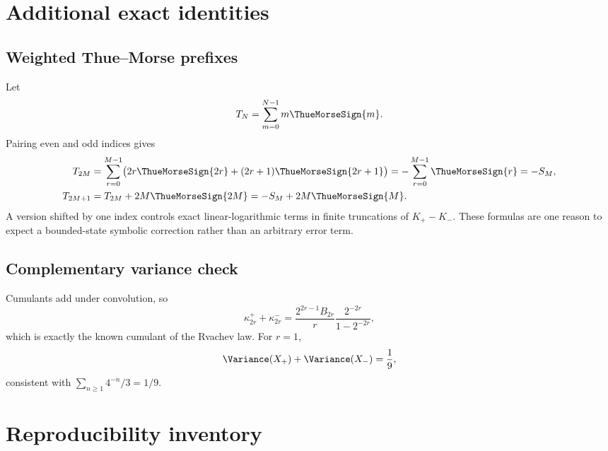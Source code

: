 \documentclass[11pt,oneside]{article}
\numberwithin{equation}{section}
\theoremstyle{definition}
\theoremstyle{remark}
\begin{document}
\appendix

\section{Additional exact identities}

\subsection{Weighted Thue--Morse prefixes}
Let
\begin{equation}
 T_N=\sum_{m=0}^{N-1}m\ThueMorseSign{m}.
 \label{eq:weighted-prefix-def}
\end{equation}
Pairing even and odd indices gives
\begin{align}
 T_{2M}
 &=\sum_{r=0}^{M-1}\bigl(2r\ThueMorseSign{2r}+(2r+1)\ThueMorseSign{2r+1}\bigr)
 =-\sum_{r=0}^{M-1}\ThueMorseSign{r}=-S_M,
 \label{eq:T-even}\\
 T_{2M+1}
 &=T_{2M}+2M\ThueMorseSign{2M}
 =-S_M+2M\ThueMorseSign{M}.
 \label{eq:T-odd}
\end{align}
A version shifted by one index controls exact linear-logarithmic terms in finite truncations
of $K_+-K_-$.  These formulas are one reason to expect a bounded-state symbolic correction
rather than an arbitrary error term.

\subsection{Complementary variance check}
Cumulants add under convolution, so
\begin{equation}
 \kappa_{2r}^++\kappa_{2r}^-
 =\frac{2^{2r-1}B_{2r}}r\frac{2^{-2r}}{1-2^{-2r}},
 \label{eq:cumulant-sum}
\end{equation}
which is exactly the known cumulant of the Rvachev law.  For $r=1$,
\begin{equation}
 \Variance(X_+)+\Variance(X_-)=\frac19,
 \label{eq:variance-sum}
\end{equation}
consistent with $\sum_{n\ge1}4^{-n}/3=1/9$.

\section{Reproducibility inventory}
\end{document}

